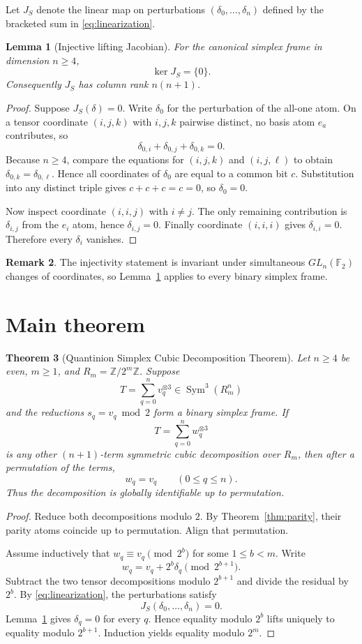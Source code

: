 \documentclass[11pt]{article}
\newtheorem{theorem}{Theorem}
\newtheorem{lemma}[theorem]{Lemma}
\theoremstyle{definition}
\newtheorem{remark}[theorem]{Remark}
\newcommand{\F}{\mathbb{F}}
\newcommand{\Z}{\mathbb{Z}}
\newcommand{\Sym}{\operatorname{Sym}}
\begin{document}
Let $J_S$ denote the linear map on perturbations $(\delta_0,\ldots,\delta_n)$ defined by the bracketed sum in \eqref{eq:linearization}.

\begin{lemma}[Injective lifting Jacobian]\label{lem:jacobian}
For the canonical simplex frame in dimension $n\ge 4$,
\[
\ker J_S=\{0\}.
\]
Consequently $J_S$ has column rank $n(n+1)$.
\end{lemma}

\begin{proof}
Suppose $J_S(\delta)=0$. Write $\delta_0$ for the perturbation of the all-one atom. On a tensor coordinate $(i,j,k)$ with $i,j,k$ pairwise distinct, no basis atom $e_a$ contributes, so
\[
\delta_{0,i}+\delta_{0,j}+\delta_{0,k}=0.
\]
Because $n\ge4$, compare the equations for $(i,j,k)$ and $(i,j,\ell)$ to obtain $\delta_{0,k}=\delta_{0,\ell}$. Hence all coordinates of $\delta_0$ are equal to a common bit $c$. Substitution into any distinct triple gives $c+c+c=c=0$, so $\delta_0=0$.

Now inspect coordinate $(i,i,j)$ with $i\ne j$. The only remaining contribution is $\delta_{i,j}$ from the $e_i$ atom, hence $\delta_{i,j}=0$. Finally coordinate $(i,i,i)$ gives $\delta_{i,i}=0$. Therefore every $\delta_i$ vanishes.
\end{proof}

\begin{remark}
The injectivity statement is invariant under simultaneous $GL_n(\F_2)$ changes of coordinates, so Lemma~\ref{lem:jacobian} applies to every binary simplex frame.
\end{remark}

\section{Main theorem}
\begin{theorem}[Quantinion Simplex Cubic Decomposition Theorem]\label{thm:main}
Let $n\ge4$ be even, $m\ge1$, and $R_m=\Z/2^m\Z$. Suppose
\[
T=\sum_{q=0}^{n}v_q^{\otimes3}\in\Sym^3(R_m^n)
\]
and the reductions $s_q=v_q\bmod2$ form a binary simplex frame. If
\[
T=\sum_{q=0}^{n}w_q^{\otimes3}
\]
is any other $(n+1)$-term symmetric cubic decomposition over $R_m$, then after a permutation of the terms,
\[
w_q=v_q\qquad(0\le q\le n).
\]
Thus the decomposition is globally identifiable up to permutation.
\end{theorem}

\begin{proof}
Reduce both decompositions modulo $2$. By Theorem~\ref{thm:parity}, their parity atoms coincide up to permutation. Align that permutation.

Assume inductively that $w_q\equiv v_q\pmod{2^b}$ for some $1\le b<m$. Write
\[
w_q=v_q+2^b\delta_q\pmod{2^{b+1}}.
\]
Subtract the two tensor decompositions modulo $2^{b+1}$ and divide the residual by $2^b$. By \eqref{eq:linearization}, the perturbations satisfy
\[
J_S(\delta_0,\ldots,\delta_n)=0.
\]
Lemma~\ref{lem:jacobian} gives $\delta_q=0$ for every $q$. Hence equality modulo $2^b$ lifts uniquely to equality modulo $2^{b+1}$. Induction yields equality modulo $2^m$.
\end{proof}
\end{document}
